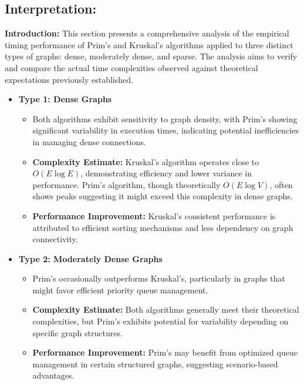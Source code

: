 \documentclass{article}
\begin{document}
\subsection*{Interpretation:}
\textbf{Introduction:} This section presents a comprehensive analysis of the empirical timing performance of Prim's and Kruskal's algorithms applied to three distinct types of graphs: dense, moderately dense, and sparse. The analysis aims to verify and compare the actual time complexities observed against theoretical expectations previously established.

\begin{itemize}
    \item \textbf{Type 1: Dense Graphs}
    \begin{itemize}
        \item Both algorithms exhibit sensitivity to graph density, with Prim’s showing significant variability in execution times, indicating potential inefficiencies in managing dense connections.
        \item \textbf{Complexity Estimate:} Kruskal's algorithm operates close to \(O(E \log E)\), demonstrating efficiency and lower variance in performance. Prim's algorithm, though theoretically \(O(E \log V)\), often shows peaks suggesting it might exceed this complexity in dense graphs.
        \item \textbf{Performance Improvement:} Kruskal's consistent performance is attributed to efficient sorting mechanisms and less dependency on graph connectivity.
    \end{itemize}

    \item \textbf{Type 2: Moderately Dense Graphs}
    \begin{itemize}
        \item Prim’s occasionally outperforms Kruskal's, particularly in graphs that might favor efficient priority queue management.
        \item \textbf{Complexity Estimate:} Both algorithms generally meet their theoretical complexities, but Prim’s exhibits potential for variability depending on specific graph structures.
        \item \textbf{Performance Improvement:} Prim’s may benefit from optimized queue management in certain structured graphs, suggesting scenario-based advantages.
    \end{itemize}


\end{itemize}
\end{document}
